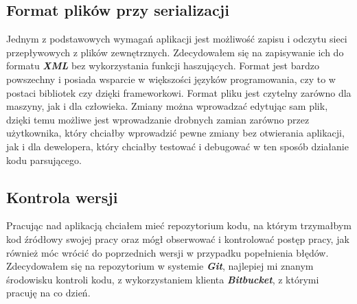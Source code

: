 \subsection{Format plików przy serializacji}
Jednym z podstawowych wymagań aplikacji jest możliwość zapisu i odczytu sieci przepływowych z plików zewnętrznych. Zdecydowałem się na zapisywanie ich do formatu \textbf{\textit{XML}} bez wykorzystania funkcji haszujących. Format jest bardzo powszechny i posiada wsparcie w większości języków programowania, czy to w postaci bibliotek czy dzięki frameworkowi. Format pliku jest czytelny zarówno dla maszyny, jak i dla człowieka. Zmiany można wprowadzać edytując sam plik, dzięki temu możliwe jest wprowadzanie drobnych zamian zarówno przez użytkownika, który chciałby wprowadzić pewne zmiany bez otwierania aplikacji, jak i dla dewelopera, który chciałby testować i debugować w ten sposób działanie kodu parsującego.
\subsection{Kontrola wersji}
Pracując nad aplikacją chciałem mieć repozytorium kodu, na którym trzymałbym kod źródłowy swojej pracy oraz mógł obserwować i kontrolować postęp pracy, jak również móc wrócić do poprzednich wersji w przypadku popełnienia błędów. Zdecydowałem się na repozytorium w systemie \textbf{\textit{Git}}, najlepiej mi znanym środowisku kontroli kodu, z wykorzystaniem klienta \textbf{\textit{Bitbucket}}, z którymi pracuję na co dzień.